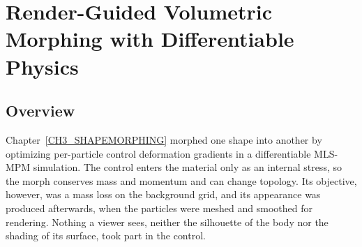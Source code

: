 
\clearpage %
\chapter{Render-Guided Volumetric Morphing with Differentiable Physics}\label{CH4_PhysMorphGS}
\usetikzlibrary{positioning,arrows.meta,fit,calc}

\section{Overview}
\label{ch4:sec_overview}

Chapter~\ref{CH3_SHAPEMORPHING} morphed one shape into another by optimizing per-particle control deformation
gradients in a differentiable MLS-MPM simulation. The control enters the material only as an internal stress, so the
morph conserves mass and momentum and can change topology. Its objective, however, was a mass loss on the background
grid, and its appearance was produced afterwards, when the particles were meshed and smoothed for rendering. Nothing a
viewer sees, neither the silhouette of the body nor the shading of its surface, took part in the control.

